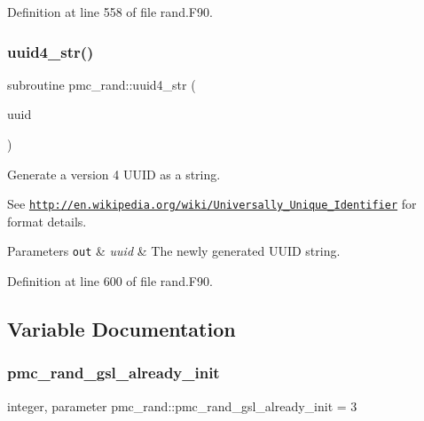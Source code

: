 Definition at line 558 of file rand.\+F90.

\mbox{\label{namespacepmc__rand_a2412b4291de3a49c6583e04382762cad}} 
\subsubsection{\texorpdfstring{uuid4\+\_\+str()}{uuid4\_str()}}
{\footnotesize\ttfamily subroutine pmc\+\_\+rand\+::uuid4\+\_\+str (\begin{DoxyParamCaption}\item[{character(len=\mbox{\hyperlink{namespacepmc__rand_a50eda03f05afa1016ef7c63910f62abf}{pmc\+\_\+uuid\+\_\+len}}), intent(out)}]{uuid }\end{DoxyParamCaption})}



Generate a version 4 U\+U\+ID as a string. 

See \href{http://en.wikipedia.org/wiki/Universally_Unique_Identifier}{\tt http\+://en.\+wikipedia.\+org/wiki/\+Universally\+\_\+\+Unique\+\_\+\+Identifier} for format details.


\begin{DoxyParams}[1]{Parameters}
\mbox{\tt out}  & {\em uuid} & The newly generated U\+U\+ID string. \\
\hline
\end{DoxyParams}


Definition at line 600 of file rand.\+F90.



\subsection{Variable Documentation}
\mbox{\label{namespacepmc__rand_a527b1327bd44917b19920fb8427a04f6}} 
\subsubsection{\texorpdfstring{pmc\+\_\+rand\+\_\+gsl\+\_\+already\+\_\+init}{pmc\_rand\_gsl\_already\_init}}
{\footnotesize\ttfamily integer, parameter pmc\+\_\+rand\+::pmc\+\_\+rand\+\_\+gsl\+\_\+already\+\_\+init = 3}



